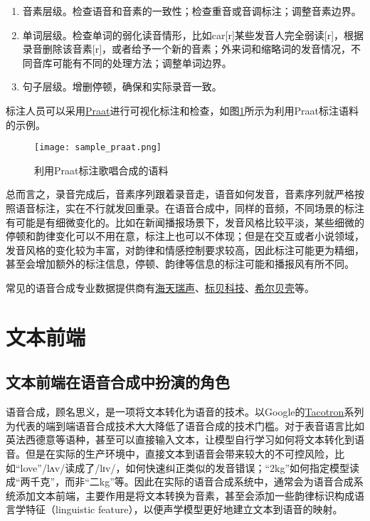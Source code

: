 \documentclass[cn,10pt,math=newtx,citestyle=gb7714-2015,bibstyle=gb7714-2015]{elegantbook}
\begin{document}
\begin{enumerate}
  \item 音素层级。检查语音和音素的一致性；检查重音或音调标注；调整音素边界。
  \item 单词层级。检查单词的弱化读音情形，比如car[r]某些发音人完全弱读[r]，根据录音删除该音素[r]，或者给予一个新的音素；外来词和缩略词的发音情况，不同音库可能有不同的处理方法；调整单词边界。
  \item 句子层级。增删停顿，确保和实际录音一致。
\end{enumerate}

标注人员可以采用\href{https://www.fon.hum.uva.nl/praat/}{Praat}进行可视化标注和检查，如图\ref{fig:sample_praat}所示为利用Praat标注语料的示例。

\begin{figure}[htbp]
  \centering
  \texttt{[image: sample\_praat.png]}
  \caption{利用Praat标注歌唱合成的语料 \label{fig:sample_praat}}
\end{figure}

总而言之，录音完成后，音素序列跟着录音走，语音如何发音，音素序列就严格按照语音标注，实在不行就发回重录。在语音合成中，同样的音频，不同场景的标注有可能是有细微变化的。比如在新闻播报场景下，发音风格比较平淡，某些细微的停顿和韵律变化可以不用在意，标注上也可以不体现；但是在交互或者小说领域，发音风格的变化较为丰富，对韵律和情感控制要求较高，因此标注可能更为精细，甚至会增加额外的标注信息，停顿、韵律等信息的标注可能和播报风有所不同。

常见的语音合成专业数据提供商有\href{http://www.speechocean.com/welcome.html}{海天瑞声}、\href{https://www.data-baker.com/}{标贝科技}、\href{http://www.aishelltech.com/}{希尔贝壳}等。

\section{文本前端}

\subsection{文本前端在语音合成中扮演的角色}

语音合成，顾名思义，是一项将文本转化为语音的技术。以Google的\href{https://google.github.io/tacotron/}{Tacotron}系列为代表的端到端语音合成技术大大降低了语音合成的技术门槛。对于表音语言比如英法西德意等语种，甚至可以直接输入文本，让模型自行学习如何将文本转化到语音。但是在实际的生产环境中，直接文本到语音会带来较大的不可控风险，比如“love”/lʌv/读成了/lɪv/，如何快速纠正类似的发音错误；“2kg”如何指定模型读成“两千克”，而非“二kg”等。因此在实际的语音合成系统中，通常会为语音合成系统添加文本前端，主要作用是将文本转换为音素，甚至会添加一些韵律标识构成语言学特征（linguistic feature），以便声学模型更好地建立文本到语音的映射。
\end{document}
